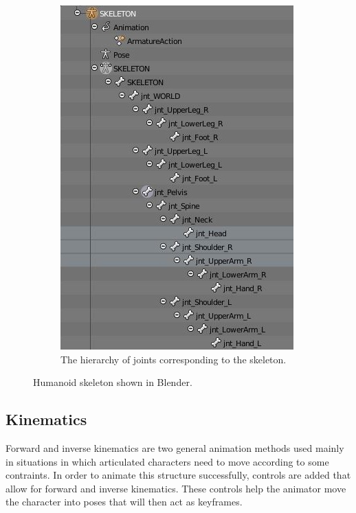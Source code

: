 \begin{figure}[h!]
\begin{subfigure}[b!]{0.4\textwidth}
                \includegraphics[width=\linewidth]{img/skeleton_hierarchy}
                \caption{The hierarchy of joints corresponding to the skeleton.}
                \label{fig:hierarchy}
        \end{subfigure}%
	\caption{Humanoid skeleton shown in Blender.}
	\label{fig:rig}
\end{figure}

\subsection{Kinematics}
Forward and inverse kinematics are two general animation methods used mainly in situations in which articulated characters need to move according to some contraints. In order to animate this structure successfully, controls are added that allow for forward and inverse kinematics. These controls help the animator move the character into poses that will then act as keyframes.

